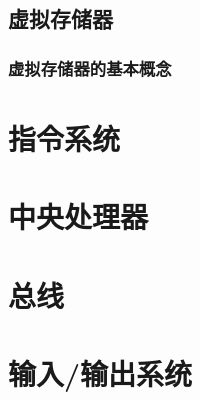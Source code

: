 \documentclass[12pt, a4paper, oneside]{ctexart}
\begin{document}
\subsection{虚拟存储器}

\subsubsection{虚拟存储器的基本概念}



\section{指令系统}

\section{中央处理器}

\section{总线}

\section{输入/输出系统}
\end{document}
